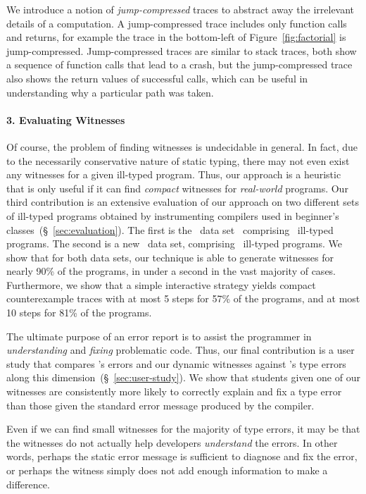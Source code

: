 We introduce a notion of \emph{jump-compressed} traces to abstract away
the irrelevant details of a computation.
%
A jump-compressed trace includes only function
calls and returns, for example the trace in the bottom-left of
Figure~\ref{fig:factorial} is jump-compressed.
%
Jump-compressed traces are similar to stack traces, both show a
sequence of function calls that lead to a crash, but the jump-compressed
trace also shows the return values of successful calls, which can be
useful in understanding why a particular path was taken.

\paragraph{3. Evaluating Witnesses}
%
Of course, the problem of finding witnesses is
undecidable in general. In fact, due to the necessarily
conservative nature of static typing, there
may not even exist any witnesses for a given
ill-typed program.
%
Thus, our approach is a heuristic that is only useful
if it can find \emph{compact} witnesses for
\emph{real-world} programs.
%
Our third contribution is an extensive evaluation of our approach
on two different sets of ill-typed programs obtained by instrumenting
compilers used in beginner's classes~(\S~\ref{sec:evaluation}).
%
The first is the \uwbench\ data set~\cite{Lerner2007-dt}
comprising \uwsize\ ill-typed programs.
%
The second is a new \ucsdbench\ data set, comprising \ucsdsize\
ill-typed programs.
%
We show that for both data sets, our technique is able to generate
witnesses for nearly 90\% of the programs, in under a second in the
vast majority of cases.
%
Furthermore, we show that a simple interactive strategy yields
compact counterexample traces with at most 5 steps for 57\%
of the programs, and at most 10 steps for 81\% of the programs.

The ultimate purpose of an error report is to assist the programmer 
in \emph{understanding} and \emph{fixing} problematic code.
%
Thus, our final contribution is a user study that compares \ocaml's 
errors and our dynamic witnesses against \ocaml's type errors 
along this dimension~(\S~\ref{sec:user-study}).
%
We show that students given one of our witnesses are consistently more
likely to correctly explain and fix a type error than those given
the standard error message produced by the \ocaml compiler.


%
Even if we can find small witnesses for the majority of type errors, it
may be that the witnesses do not actually help developers
\emph{understand} the errors.
%
In other words, perhaps the static error message is sufficient to
diagnose and fix the error, or perhaps the witness simply does not add
enough information to make a difference.
%

